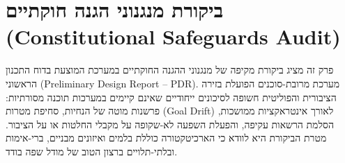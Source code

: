 
\section{ביקורת מנגנוני הגנה חוקתיים (\textenglish{Constitutional Safeguards Audit})}
\label{sec:constitutional-audit}

פרק זה מציג ביקורת מקיפה של מנגנוני ההגנה החוקתיים במערכת המוצעת בדוח התכנון הראשוני (\textenglish{Preliminary Design Report -- PDR}). מערכת מרובת-סוכנים הפועלת בזירה הציבורית והפוליטית חשופה לסיכונים ייחודיים שאינם קיימים במערכות תוכנה מסורתיות: פרשנות מוטה של הנחיות, סחיפת מטרות (\textenglish{Goal Drift}) לאורך אינטראקציות ממושכות, הסלמת הרשאות עקיפה, והפעלת השפעה לא-שקופה על מקבלי החלטות או על הציבור. מטרת הביקורת היא לוודא כי הארכיטקטורה כוללת בלמים ואיזונים מבניים, ברי-אימות ובלתי-תלויים ברצון הטוב של מודל שפה בודד.

